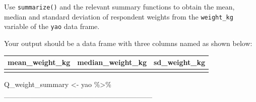 \documentclass[
  letterpaper,
  DIV=11,
  numbers=noendperiod]{scrreprt}
\newenvironment{Shaded}{\begin{snugshade}}{\end{snugshade}}
\newcommand{\NormalTok}[1]{\textcolor[rgb]{0.00,0.23,0.31}{#1}}
\newcommand{\OtherTok}[1]{\textcolor[rgb]{0.00,0.23,0.31}{#1}}
\newcommand{\SpecialCharTok}[1]{\textcolor[rgb]{0.37,0.37,0.37}{#1}}
\begin{document}
\begin{tcolorbox}[enhanced jigsaw, title=\textcolor{quarto-callout-tip-color}{\faLightbulb}\hspace{0.5em}{Practice}, colbacktitle=quarto-callout-tip-color!10!white, leftrule=.75mm, arc=.35mm, opacityback=0, bottomrule=.15mm, rightrule=.15mm, toptitle=1mm, breakable, toprule=.15mm, colback=white, coltitle=black, colframe=quarto-callout-tip-color-frame, bottomtitle=1mm, titlerule=0mm, left=2mm, opacitybacktitle=0.6]

Use \texttt{summarize()} and the relevant summary functions to obtain
the mean, median and standard deviation of respondent weights from the
\texttt{weight\_kg} variable of the \texttt{yao} data frame.

Your output should be a data frame with three columns named as shown
below:

\begin{longtable}[]{@{}lll@{}}
\toprule\noalign{}
mean\_weight\_kg & median\_weight\_kg & sd\_weight\_kg \\
\midrule\noalign{}
\endhead
\bottomrule\noalign{}
\endlastfoot
& & \\
\end{longtable}

\begin{Shaded}
\begin{Highlighting}[]
\NormalTok{Q\_weight\_summary }\OtherTok{\textless{}{-}} 
\NormalTok{  yao }\SpecialCharTok{\%\textgreater{}\%}
\NormalTok{  \_\_\_\_\_\_\_\_\_\_\_\_\_\_\_\_\_\_\_\_\_\_\_\_\_\_\_\_}
\end{Highlighting}
\end{Shaded}

\end{tcolorbox}
\end{document}
